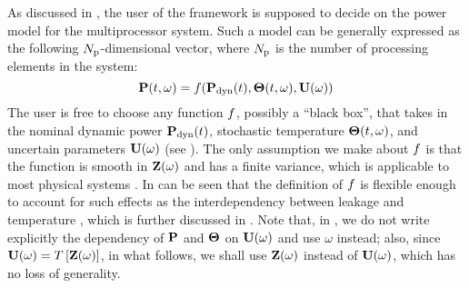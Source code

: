 As discussed in , the user of the framework is supposed to decide on the power model for the multiprocessor system. Such a model can be generally expressed as the following ${N_\text{p}}$-dimensional vector, where ${N_\text{p}}$ is the number of processing elements in the system:
\begin{equation} \elabel{power-model}
  \vP(\t, \o) = \f(\vP_\dyn(\t), \vTO(\t, \o), \vU(\o))
\end{equation}
The user is free to choose any function $f$, possibly a ``black box'', that takes in the nominal dynamic power $\mathbf{P}_{\text{dyn}}(t)$, stochastic temperature ${\boldsymbol\Theta}(t, \omega)$, and uncertain parameters $\mathbf{U}(\omega)$ (see ). The only assumption we make about $f$ is that the function is smooth in $\mathbf{Z}(\omega)$ and has a finite variance, which is applicable to most physical systems \cite{xiu2002}. In can be seen that the definition of $f$ is flexible enough to account for such effects as the interdependency between leakage and temperature \cite{srivastava2010, liu2007}, which is further discussed in . Note that, in , we do not write explicitly the dependency of $\mathbf{P}$ and ${\boldsymbol\Theta}$ on $\mathbf{U}(\omega)$ and use $\omega$ instead; also, since $\mathbf{U}(\omega) = T\left[\mathbf{Z}(\omega)\right]$, in what follows, we shall use $\mathbf{Z}(\omega)$ instead of $\mathbf{U}(\omega)$, which has no loss of generality.
